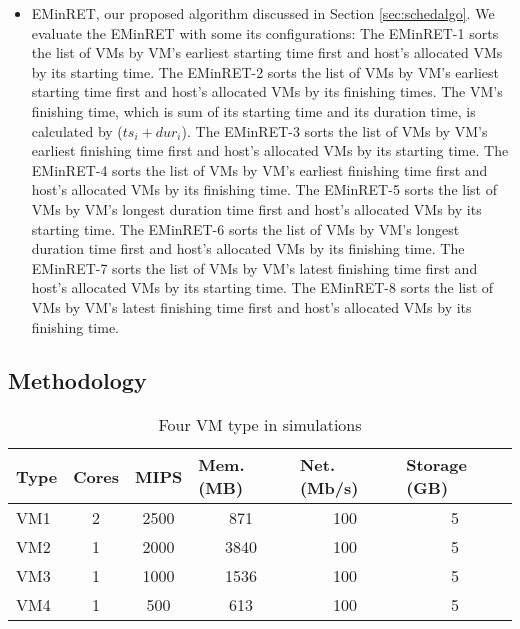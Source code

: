 \begin{itemize}
\item
EMinRET, our proposed algorithm discussed in Section \ref{sec:schedalgo}. We evaluate the EMinRET with some its configurations:
 The EMinRET-1 sorts the list of VMs by VM's earliest starting time first and host's allocated VMs by its starting time.
 The EMinRET-2 sorts the list of VMs by VM's earliest starting time first and host's allocated VMs by its finishing times.
 The VM's finishing time, which is sum of its starting time and its duration time, is calculated by ($ts_{i}+dur_{i}$).
 The EMinRET-3 sorts the list of VMs by VM's earliest finishing time first and host's allocated VMs by its starting time.
 The EMinRET-4 sorts the list of VMs by VM's earliest finishing time first and host's allocated VMs by its finishing time.
 The EMinRET-5 sorts the list of VMs by VM's longest duration time first and host's allocated VMs by its starting time.
 The EMinRET-6 sorts the list of VMs by VM's longest duration time first and host's allocated VMs by its finishing time.
 The EMinRET-7 sorts the list of VMs by VM's latest finishing time first and host's allocated VMs by its starting time.
 The EMinRET-8 sorts the list of VMs by VM's latest finishing time first and host's allocated VMs by its finishing time.


\end{itemize}

\subsection{Methodology}

\begin{table}[htp]
\caption{Four VM type in simulations}
\label{tab:vmtype}
\centering

\begin{tabular}{|l|c|c|c|c|c|}
\hline
Type                    & \multicolumn{1}{l|}{Cores} & \multicolumn{1}{l|}{MIPS} & \multicolumn{1}{l|}{Mem. (MB)} & \multicolumn{1}{l|}{Net. (Mb/s)} & \multicolumn{1}{l|}{Storage (GB)} \\ \hline
VM1                     & 2                              & 2500                     & 871                             & 100                             & 5                             \\
VM2	 					& 1                              & 2000                     & 3840                            & 100                             & 5                             \\
VM3                     & 1                              & 1000                     & 1536                            & 100                             & 5                             \\
VM4                     & 1                              & 500                       & 613                             & 100                             & 5                             \\ \hline
\end{tabular}
\end{table}
 
